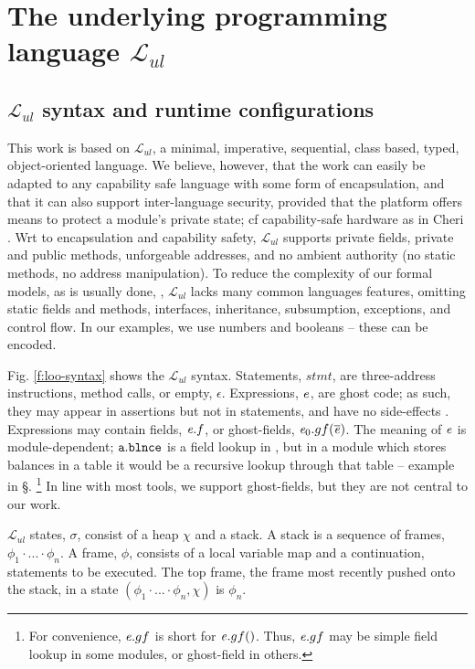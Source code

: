 \renewcommand{\LangOO}{\ensuremath{{\mathcal{L}}_{ul}}\xspace }

\section{The underlying programming language \LangOO}  
\label{sect:underlying}

\subsection{\LangOO syntax and runtime configurations}
\label{sub:Loo} 
This work is based on \LangOO, a {minimal}, imperative, sequential,  class based, typed, object-oriented language. 
We believe, however, that the work can easily be adapted to any capability safe language with some form of encapsulation,
and that it can also support inter-language security, provided that the 
platform offers means to protect a module’s private state; cf capability-safe hardware as in Cheri \cite{davis2019cheriabi}.
Wrt to encapsulation and  capability safety,  \LangOO supports private fields, private and public methods, unforgeable addresses, and no ambient authority (no static methods, no address manipulation).
To reduce the complexity of our formal models, as is usually done, \eg \cite{IgaPieWadTOPLAS01,DietlDrossopoulouMueller07a,ParBiePOPL05},  \LangOO lacks many common languages features, omitting static fields and methods, interfaces,
inheritance, subsumption, exceptions, and control flow.  
{In our examples, we use numbers and booleans -- these can be encoded.}
 
Fig. \ref{f:loo-syntax} shows the   \LangOO syntax. {Statements, $stmt$, are three-address instructions,   method calls, or empty, $\epsilon$.}  
Expressions, $\mathit{e}$, are ghost code;  as such, they may appear in assertions but not in statements, and have no side-effects \cite{ghost,ghost:spirit}.
Expressions  may contain fields, $\mathit{e}.f$, or ghost-fields, ${\mathit{e}_0.gf(\overline {\mathit{e}})}$.
The meaning of $\mathit{e}$ is module-dependent; \eg$\mbox{\normalfont{\texttt{a}}}.\mbox{\normalfont{\texttt{\mbox{\normalfont{\texttt{blnce}}}}}}$   is a field lookup  in \ModA , but in a module which stores balances in a table it would be a recursive lookup through that table  -- \cf example   in \S {}. 
  \footnote
{For convenience,   $\mathit{e}.gf$ is short for $\mathit{e}.gf()$. Thus,  $\mathit{e}.gf$ may be simple field lookup  in some modules, or  ghost-field  in others. }
In line with most tools, we support ghost-fields, but they are not central to our work.
 

\LangOO states, $\sigma$,  consist of a  heap $\chi$ and a stack. 
{A stack  is a sequence of frames, $\phi_1\!\cdot\!...\!\cdot\! \phi_n$.}
A  frame, $\phi$, consists of a local variable map and a continuation,   
statements to be executed.
The top frame, \ie  the frame most recently pushed onto the stack,  in a state $(\phi_1\!\cdot\!...\!\cdot\! \phi_n, \chi)$ is $\phi_n$.




